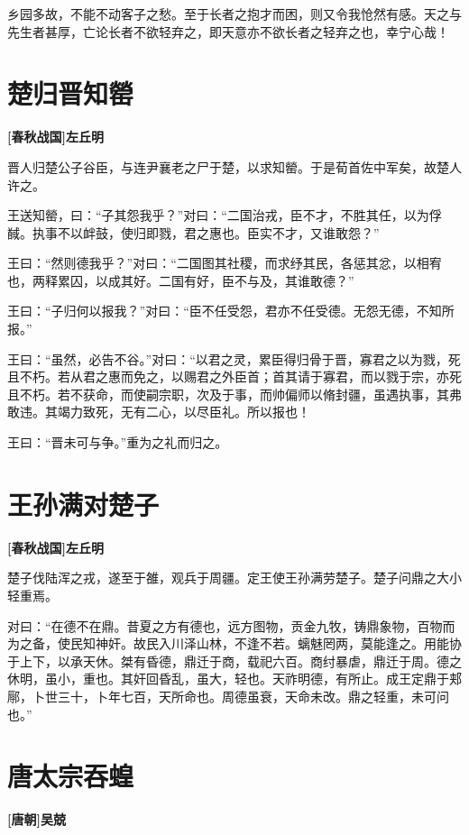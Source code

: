 \documentclass[UTF8,titlepage,oneside]{ctexbook}
\begin{document}
乡园多故，不能不动客子之愁。至于长者之抱才而困，则又令我怆然有感。天之与先生者甚厚，亡论长者不欲轻弃之，即天意亦不欲长者之轻弃之也，幸宁心哉！


\chapter*{楚归晋知罃}
\begin{center}
	\textbf{[春秋战国]左丘明}
\end{center}


晋人归楚公子谷臣，与连尹襄老之尸于楚，以求知罃。于是荀首佐中军矣，故楚人许之。


王送知罃，曰：“子其怨我乎？”对曰：“二国治戎，臣不才，不胜其任，以为俘馘。执事不以衅鼓，使归即戮，君之惠也。臣实不才，又谁敢怨？”


王曰：“然则德我乎？”对曰：“二国图其社稷，而求纾其民，各惩其忿，以相宥也，两释累囚，以成其好。二国有好，臣不与及，其谁敢德？”


王曰：“子归何以报我？”对曰：“臣不任受怨，君亦不任受德。无怨无德，不知所报。”


王曰：“虽然，必告不谷。”对曰：“以君之灵，累臣得归骨于晋，寡君之以为戮，死且不朽。若从君之惠而免之，以赐君之外臣首；首其请于寡君，而以戮于宗，亦死且不朽。若不获命，而使嗣宗职，次及于事，而帅偏师以脩封疆，虽遇执事，其弗敢违。其竭力致死，无有二心，以尽臣礼。所以报也！


王曰：“晋未可与争。”重为之礼而归之。



\chapter*{王孙满对楚子}
\begin{center}
	\textbf{[春秋战国]左丘明}
\end{center}


楚子伐陆浑之戎，遂至于雒，观兵于周疆。定王使王孙满劳楚子。楚子问鼎之大小轻重焉。


对曰：“在德不在鼎。昔夏之方有德也，远方图物，贡金九牧，铸鼎象物，百物而为之备，使民知神奸。故民入川泽山林，不逢不若。螭魅罔两，莫能逢之。用能协于上下，以承天休。桀有昏德，鼎迁于商，载祀六百。商纣暴虐，鼎迁于周。德之休明，虽小，重也。其奸回昏乱，虽大，轻也。天祚明德，有所止。成王定鼎于郏鄏，卜世三十，卜年七百，天所命也。周德虽衰，天命未改。鼎之轻重，未可问也。”



\chapter*{唐太宗吞蝗}
\begin{center}
	\textbf{[唐朝]吴兢}
\end{center}
\end{document}
